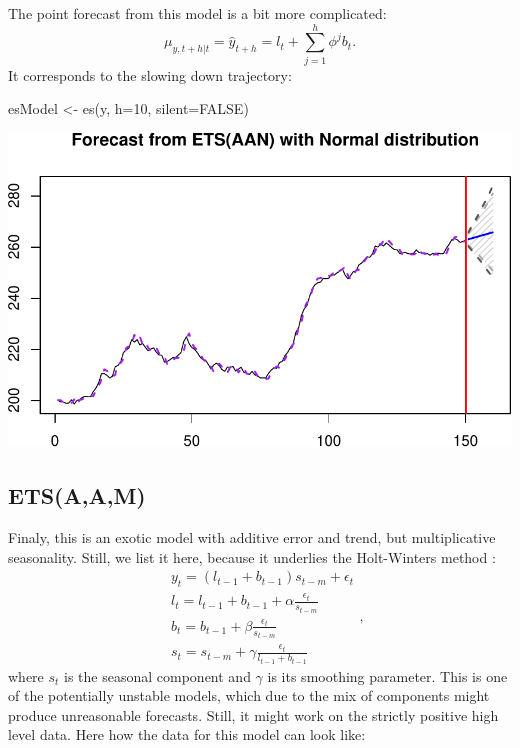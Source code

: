 \documentclass[
]{book}
\newenvironment{Shaded}{\begin{snugshade}}{\end{snugshade}}
\newcommand{\AttributeTok}[1]{\textcolor[rgb]{0.77,0.63,0.00}{#1}}
\newcommand{\ConstantTok}[1]{\textcolor[rgb]{0.00,0.00,0.00}{#1}}
\newcommand{\DecValTok}[1]{\textcolor[rgb]{0.00,0.00,0.81}{#1}}
\newcommand{\FunctionTok}[1]{\textcolor[rgb]{0.00,0.00,0.00}{#1}}
\newcommand{\NormalTok}[1]{#1}
\newcommand{\OtherTok}[1]{\textcolor[rgb]{0.56,0.35,0.01}{#1}}
\theoremstyle{definition}
\theoremstyle{definition}
\theoremstyle{definition}
\theoremstyle{definition}
\theoremstyle{remark}
\begin{document}
The point forecast from this model is a bit more complicated:
\begin{equation}
    \mu_{y,t+h|t} = \hat{y}_{t+h} = l_{t} + \sum_{j=1}^h \phi^j b_t.
  \label{eq:ETSAANForecast}
\end{equation}
It corresponds to the slowing down trajectory:

\begin{Shaded}
\begin{Highlighting}[]
\NormalTok{esModel }\OtherTok{\textless{}{-}} \FunctionTok{es}\NormalTok{(y, }\AttributeTok{h=}\DecValTok{10}\NormalTok{, }\AttributeTok{silent=}\ConstantTok{FALSE}\NormalTok{)}
\end{Highlighting}
\end{Shaded}

\includegraphics{adam_files/figure-latex/unnamed-chunk-28-1.pdf}

\hypertarget{etsaam}{%
\subsection{ETS(A,A,M)}\label{etsaam}}

Finaly, this is an exotic model with additive error and trend, but multiplicative seasonality. Still, we list it here, because it underlies the Holt-Winters method \citep{Winters1960}:
\begin{equation}
  \begin{aligned}
    & y_{t} = (l_{t-1} + b_{t-1}) s_{t-m} + \epsilon_t \\
    & l_t = l_{t-1} + b_{t-1} + \alpha \frac{\epsilon_t}{s_{t-m}} \\
    & b_t = b_{t-1} + \beta \frac{\epsilon_t}{s_{t-m}} \\
    & s_t = s_{t-m} + \gamma \frac{\epsilon_t}{l_{t-1}+b_{t-1}}
  \end{aligned} ,
  \label{eq:ETSAAM}
\end{equation}
where \(s_t\) is the seasonal component and \(\gamma\) is its smoothing parameter. This is one of the potentially unstable models, which due to the mix of components might produce unreasonable forecasts. Still, it might work on the strictly positive high level data. Here how the data for this model can look like:
\end{document}
